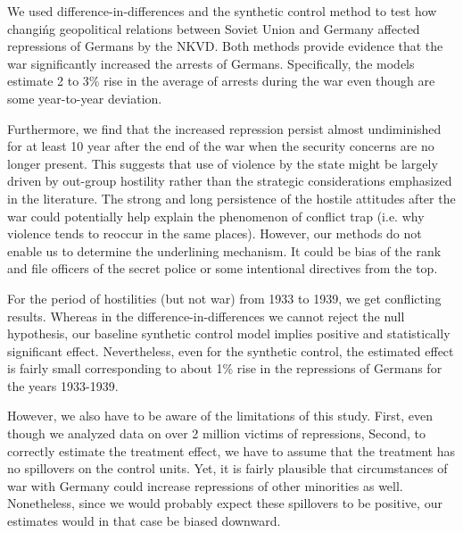 We used difference-in-differences and the synthetic control method to test how changińg geopolitical relations between Soviet Union and Germany  affected repressions of Germans by the NKVD. 
Both methods provide evidence that the war significantly increased the arrests of Germans.
Specifically, the models estimate 2 to 3\% rise in the average of arrests during the war even though are some year-to-year deviation. 

Furthermore, we find that the increased repression persist almost undiminished for at least 10 year after the end of the war when the security concerns are no longer present.
This  suggests that use of violence by the state might be largely driven by out-group 
hostility rather than the strategic considerations emphasized in the literature. 
The strong and long persistence of the hostile attitudes after the war could potentially help explain the phenomenon of conflict trap (i.e. why violence tends to reoccur in the same places). 
However, our methods do not enable us to determine the underlining mechanism. It could be bias of the rank and file officers of the secret police or some intentional directives from the top. %

For the period of hostilities (but not war) from 1933 to 1939, we get conflicting results. Whereas in the difference-in-differences we cannot reject the null hypothesis, our baseline synthetic control model implies positive and statistically significant effect. Nevertheless, even for the synthetic control, the estimated effect is fairly small corresponding to about 1\% rise in the repressions of Germans for the years 1933-1939.

However, we also  have to be aware of the limitations of this study. 
First, even though we analyzed data on over 2 million victims of repressions, 
Second, to correctly estimate the treatment effect, we have to assume that the treatment has no spillovers on the control units. Yet, it is fairly plausible that circumstances of war with Germany could increase repressions of other minorities as well.
Nonetheless, since we would probably expect these spillovers  to be positive, our estimates would in that case be biased downward.

